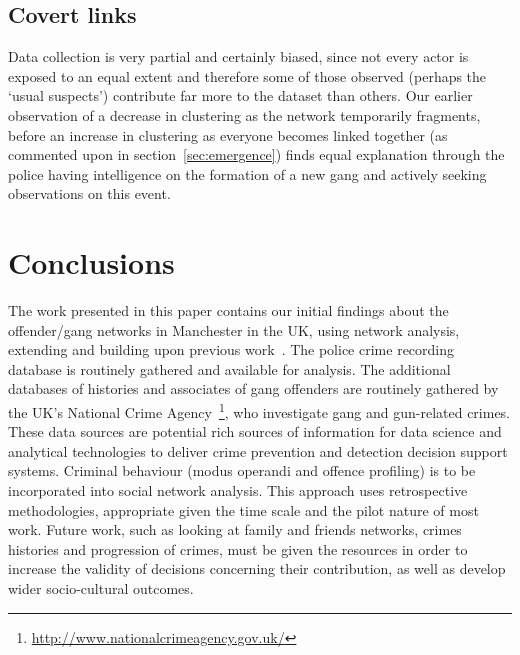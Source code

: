 \documentclass[twocolumn]{svjour3}          %
\theoremstyle{definition}
\begin{document}
\subsection{Covert links}

Data collection is very partial and certainly biased, since not every
actor is exposed to an equal extent and therefore some of those
observed (perhaps the `usual suspects') contribute far more to the
dataset than others. Our earlier observation of a decrease in
clustering as the network temporarily fragments, before an increase in
clustering as everyone becomes linked together (as commented upon in
section~\ref{sec:emergence}) finds equal explanation through the
police having intelligence on the formation of a new gang and actively
seeking observations on this event.

\section{Conclusions}\label{sec:conclusion}

The work presented in this paper contains our initial findings about
the offender/gang networks in Manchester in the UK, using network
analysis, extending and building upon previous
work~\citep{oatley+crick_asonam2014,oatley+crick_fosintsi2014}. The
police crime recording database is routinely gathered and available
for analysis. The additional databases of histories and associates of
gang offenders are routinely gathered by the UK's National Crime
Agency~\footnote{\url{http://www.nationalcrimeagency.gov.uk/}}, who
investigate gang and gun-related crimes. These data sources are
potential rich sources of information for data science and analytical
technologies to deliver crime prevention and detection decision
support systems. Criminal behaviour (modus operandi and offence
profiling) is to be incorporated into social network analysis.  This
approach uses retrospective methodologies, appropriate given the time
scale and the pilot nature of most work. Future work, such as looking
at family and friends networks, crimes histories and progression of
crimes, must be given the resources in order to increase the validity
of decisions concerning their contribution, as well as develop wider
socio-cultural outcomes.
\end{document}
